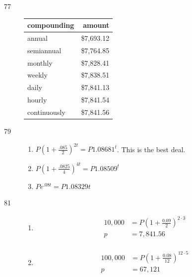 \documentclass{exam}
\begin{document}
\begin{description}
      \item[77]
        \begin{tabular}[H]{lr}
          \toprule
          compounding  & amount \\
          \midrule
          annual       & \$7,693.12 \\
          semiannual   & \$7,764.85 \\
          monthly      & \$7,828.41 \\
          weekly       & \$7,838.51 \\
          daily        & \$7,841.13 \\
          hourly       & \$7,841.54 \\
          continuously & \$7,841.56 \\
          \bottomrule
        \end{tabular}

      \item[79]
        \begin{enumerate}[i]
          \item $P \left( 1 + \frac{.085}{2} \right)^{2t} = P 1.08681^t$.  This is the best deal.
          \item $P \left( 1 + \frac{.0825}{4} \right)^{4t} = P 1.08509^t$
          \item $P e^{.08t} = P 1.08329 t$
        \end{enumerate}

      \item[81]
        \begin{enumerate}[a]
          \item 
            \begin{align*}
              10,000 &= P  \left( 1 + \frac{0.09}{2} \right)^{2 \cdot 3} \\
              p &= 7,841.56 \\
            \end{align*}

          \item 
            \begin{align*}
              100,000 &= P  \left( 1 + \frac{0.08}{12} \right)^{12 \cdot 5} \\
              p &= 67,121 \\
            \end{align*}
        \end{enumerate}


\end{description}
\end{document}
